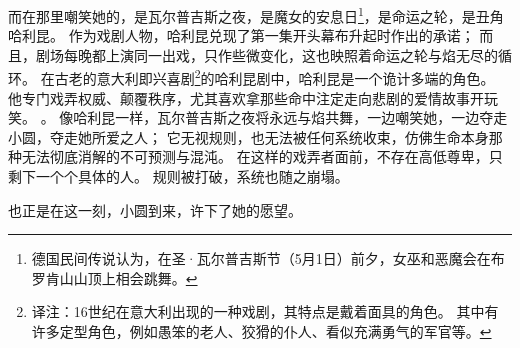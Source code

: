 而在那里嘲笑她的，是瓦尔普吉斯之夜，是魔女的安息日\footnote{%
    德国民间传说认为，在圣·瓦尔普吉斯节（5月1日）前夕，女巫和恶魔会在布罗肯山山顶上相会跳舞。
}\cite{ref69}，是命运之轮，是丑角哈利昆。
作为戏剧人物，哈利昆兑现了第一集开头幕布升起时作出的承诺；
而且，剧场每晚都上演同一出戏，只作些微变化，这也映照着命运之轮与焰无尽的循环。
在古老的意大利即兴喜剧\footnote{%
    译注：16世纪在意大利出现的一种戏剧，其特点是戴着面具的角色。
    其中有许多定型角色，例如愚笨的老人、狡猾的仆人、看似充满勇气的军官等。
}的哈利昆剧中，哈利昆是一个诡计多端的角色。
他专门戏弄权威、颠覆秩序，尤其喜欢拿那些命中注定走向悲剧的爱情故事开玩笑。
\cite{ref70}。
像哈利昆一样，瓦尔普吉斯之夜将永远与焰共舞，一边嘲笑她，一边夺走小圆，夺走她所爱之人；
它无视规则，也无法被任何系统收束，仿佛生命本身那种无法彻底消解的不可预测与混沌。
在这样的戏弄者面前，不存在高低尊卑，只剩下一个个具体的人。
规则被打破，系统也随之崩塌。

也正是在这一刻，小圆到来，许下了她的愿望。
